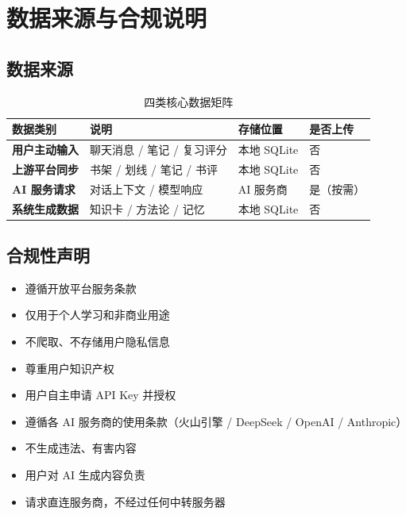 \documentclass[12pt,a4paper,nomath]{harryopo-report}
\begin{document}
\ifshowappendix
\chapter{数据来源与合规说明}

\section{数据来源}
\begin{table}[htbp]
\centering
\begin{tabularx}{\textwidth}{>{\bfseries}l X X X}
\toprule
\textbf{数据类别} & \textbf{说明} & \textbf{存储位置} & \textbf{是否上传} \\
\midrule
用户主动输入 & 聊天消息 / 笔记 / 复习评分 & 本地 SQLite & 否 \\
上游平台同步 & 书架 / 划线 / 笔记 / 书评 & 本地 SQLite & 否 \\
AI 服务请求 & 对话上下文 / 模型响应 & AI 服务商 & 是（按需） \\
系统生成数据 & 知识卡 / 方法论 / 记忆 & 本地 SQLite & 否 \\
\bottomrule
\end{tabularx}
\caption{四类核心数据矩阵}
\label{tab:data-source}
\end{table}

\section{合规性声明}

\begin{itemize}
    \item 遵循开放平台服务条款
    \item 仅用于个人学习和非商业用途
    \item 不爬取、不存储用户隐私信息
    \item 尊重用户知识产权
    \item 用户自主申请 API Key 并授权
\end{itemize}

\begin{itemize}
    \item 遵循各 AI 服务商的使用条款（火山引擎 / DeepSeek / OpenAI / Anthropic）
    \item 不生成违法、有害内容
    \item 用户对 AI 生成内容负责
    \item 请求直连服务商，不经过任何中转服务器
\end{itemize}
\end{document}
